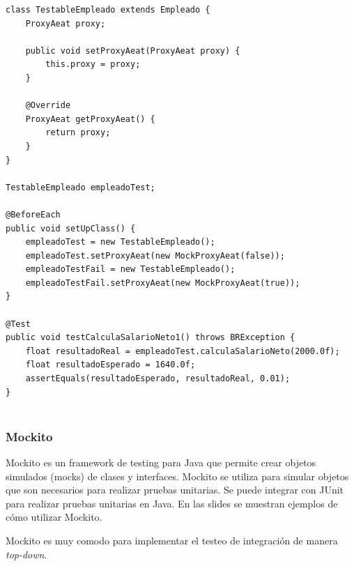 \begin{lstlisting}[caption={Utilizar en el testing}]
class TestableEmpleado extends Empleado {
	ProxyAeat proxy;

	public void setProxyAeat(ProxyAeat proxy) {
		this.proxy = proxy;
	}

	@Override
	ProxyAeat getProxyAeat() {
		return proxy;
	}
}

TestableEmpleado empleadoTest;

@BeforeEach
public void setUpClass() {
	empleadoTest = new TestableEmpleado();
	empleadoTest.setProxyAeat(new MockProxyAeat(false));
	empleadoTestFail = new TestableEmpleado();
	empleadoTestFail.setProxyAeat(new MockProxyAeat(true));
}

@Test
public void testCalculaSalarioNeto1() throws BRException {
	float resultadoReal = empleadoTest.calculaSalarioNeto(2000.0f);
	float resultadoEsperado = 1640.0f;
	assertEquals(resultadoEsperado, resultadoReal, 0.01);
}
	
\end{lstlisting}
\subsubsection{Mockito}
Mockito es un framework de testing para Java que permite crear objetos simulados (mocks) de clases y interfaces. Mockito se utiliza para simular objetos que son necesarios para realizar pruebas unitarias. Se puede integrar con JUnit para realizar pruebas unitarias en Java. 
En las slides se muestran ejemplos de cómo utilizar Mockito.

Mockito es muy comodo para implementar el testeo de integración de manera \textit{top-down}.

